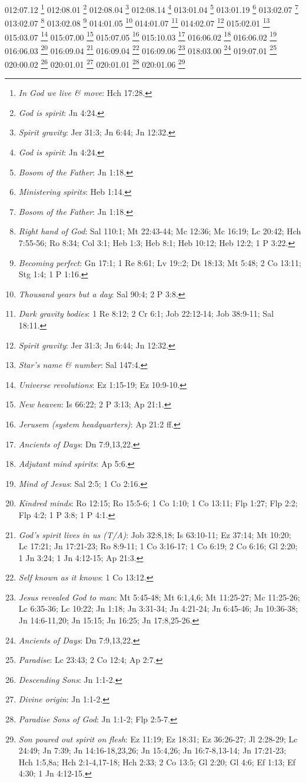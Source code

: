 {012:07.12 \footnote{\textit{In God we live & move}: Hch 17:28.}
012:08.01 \footnote{\textit{God is spirit}: Jn 4:24.}
012:08.04 \footnote{\textit{Spirit gravity}: Jer 31:3; Jn 6:44; Jn 12:32.}
012:08.14 \footnote{\textit{God is spirit}: Jn 4:24.}
013:01.04 \footnote{\textit{Bosom of the Father}: Jn 1:18.}
013:01.19 \footnote{\textit{Ministering spirits}: Heb 1:14.}
013:02.07 \footnote{\textit{Bosom of the Father}: Jn 1:18.}
013:02.07 \footnote{\textit{Right hand of God}: Sal 110:1; Mt 22:43-44; Mc 12:36; Mc 16:19; Lc 20:42; Hch 7:55-56; Ro 8:34; Col 3:1; Heb 1:3; Heb 8:1; Heb 10:12; Heb 12:2; 1 P 3:22.}
013:02.08 \footnote{\textit{Becoming perfect}: Gn 17:1; 1 Re 8:61; Lv 19::2; Dt 18:13; Mt 5:48; 2 Co 13:11; Stg 1:4; 1 P 1:16.}
014:01.05 \footnote{\textit{Thousand years but a day}: Sal 90:4; 2 P 3:8.}
014:01.07 \footnote{\textit{Dark gravity bodies}: 1 Re 8:12; 2 Cr 6:1; Job 22:12-14; Job 38:9-11; Sal 18:11.}
014:02.07 \footnote{\textit{Spirit gravity}: Jer 31:3; Jn 6:44; Jn 12:32.}
015:02.01 \footnote{\textit{Star's name & number}: Sal 147:4.}
015:03.07 \footnote{\textit{Universe revolutions}: Ez 1:15-19; Ez 10:9-10.}
015:07.00 \footnote{\textit{New heaven}: Is 66:22; 2 P 3:13; Ap 21:1.}
015:07.05 \footnote{\textit{Jerusem (system headquarters)}: Ap 21:2 ff.}
015:10.03 \footnote{\textit{Ancients of Days}: Dn 7:9,13,22.}
016:06.02 \footnote{\textit{Adjutant mind spirits}: Ap 5:6.}
016:06.02 \footnote{\textit{Mind of Jesus}: Sal 2:5; 1 Co 2:16.}
016:06.03 \footnote{\textit{Kindred minds}: Ro 12:15; Ro 15:5-6; 1 Co 1:10; 1 Co 13:11; Flp 1:27; Flp 2:2; Flp 4:2; 1 P 3:8; 1 P 4:1.}
016:09.04 \footnote{\textit{God's spirit lives in us (T/A)}: Job 32:8,18; Is 63:10-11; Ez 37:14; Mt 10:20; Lc 17:21; Jn 17:21-23; Ro 8:9-11; 1 Co 3:16-17; 1 Co 6:19; 2 Co 6:16; Gl 2:20; 1 Jn 3:24; 1 Jn 4:12-15; Ap 21:3.}
016:09.04 \footnote{\textit{Self known as it knows}: 1 Co 13:12.}
016:09.06 \footnote{\textit{Jesus revealed God to man}: Mt 5:45-48; Mt 6:1,4,6; Mt 11:25-27; Mc 11:25-26; Lc 6:35-36; Lc 10:22; Jn 1:18; Jn 3:31-34; Jn 4:21-24; Jn 6:45-46; Jn 10:36-38; Jn 14:6-11,20; Jn 15:15; Jn 16:25; Jn 17:8,25-26.}
018:03.00 \footnote{\textit{Ancients of Days}: Dn 7:9,13,22.}
019:07.01 \footnote{\textit{Paradise}: Lc 23:43; 2 Co 12:4; Ap 2:7.}
020:00.02 \footnote{\textit{Descending Sons}: Jn 1:1-2.}
020:01.01 \footnote{\textit{Divine origin}: Jn 1:1-2.}
020:01.01 \footnote{\textit{Paradise Sons of God}: Jn 1:1-2; Flp 2:5-7.}
020:01.06 \footnote{\textit{Son poured out spirit on flesh}: Ez 11:19; Ez 18:31; Ez 36:26-27; Jl 2:28-29; Lc 24:49; Jn 7:39; Jn 14:16-18,23,26; Jn 15:4,26; Jn 16:7-8,13-14; Jn 17:21-23; Hch 1:5,8a; Hch 2:1-4,17-18; Hch 2:33; 2 Co 13:5; Gl 2:20; Gl 4:6; Ef 1:13; Ef 4:30; 1 Jn 4:12-15.}
}
